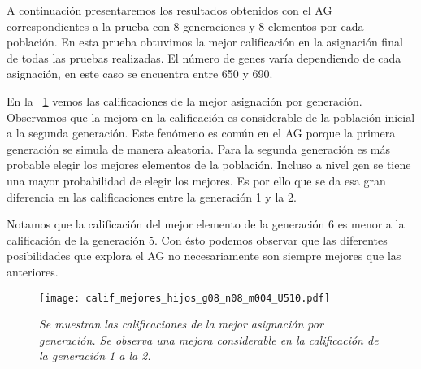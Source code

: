 A continuación presentaremos los resultados obtenidos con el AG correspondientes a la prueba con 8 generaciones y 8 elementos por cada población. En esta prueba obtuvimos la mejor calificación en la asignación final de todas las pruebas realizadas. El número de genes varía dependiendo de cada asignación, en este caso se encuentra entre 650 y 690.


%
%
%



En la \figurename{~\ref{EjcalifMejoresHijos}} vemos las calificaciones de la mejor asignación por generación. Observamos que la mejora en la calificación es considerable de la población inicial a la segunda generación. Este fenómeno es común en el AG porque la primera generación se simula de manera aleatoria. Para la segunda generación es más probable elegir los mejores elementos de la población. Incluso a nivel gen se tiene una mayor probabilidad de elegir los mejores. Es por ello que se da esa gran diferencia en las calificaciones entre la generación 1 y la 2.

Notamos que la calificación del mejor elemento de la generación 6 es menor a la calificación de la generación 5. Con ésto podemos observar que las diferentes posibilidades que explora el AG no necesariamente son siempre mejores que las anteriores.


\begin{figure}[H]
\centering
\texttt{[image: calif\_mejores\_hijos\_g08\_n08\_m004\_U510.pdf]} %
\caption[\textit{Calificaciones de las mejores asignaciones por generación}]{\textit{Se muestran las calificaciones de la mejor asignación por generación. Se observa una mejora considerable en la calificación de la generación 1 a la 2.}}\label{EjcalifMejoresHijos}
\end{figure}

%

